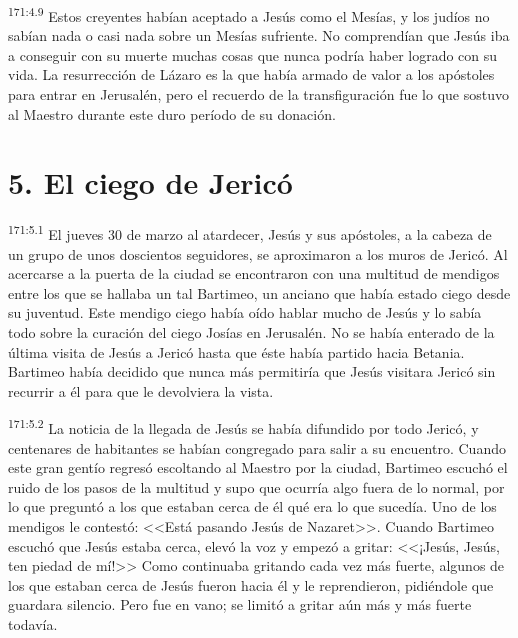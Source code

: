 \par 
\textsuperscript{171:4.9} Estos creyentes habían aceptado a Jesús como el Mesías, y los judíos no sabían nada o casi nada sobre un Mesías sufriente. No comprendían que Jesús iba a conseguir con su muerte muchas cosas que nunca podría haber logrado con su vida. La resurrección de Lázaro es la que había armado de valor a los apóstoles para entrar en Jerusalén, pero el recuerdo de la transfiguración fue lo que sostuvo al Maestro durante este duro período de su donación.

\section*{5. El ciego de Jericó}
\par 
\textsuperscript{171:5.1} El jueves 30 de marzo al atardecer, Jesús y sus apóstoles, a la cabeza de un grupo de unos doscientos seguidores, se aproximaron a los muros de Jericó. Al acercarse a la puerta de la ciudad se encontraron con una multitud de mendigos entre los que se hallaba un tal Bartimeo, un anciano que había estado ciego desde su juventud. Este mendigo ciego había oído hablar mucho de Jesús y lo sabía todo sobre la curación del ciego Josías en Jerusalén. No se había enterado de la última visita de Jesús a Jericó hasta que éste había partido hacia Betania. Bartimeo había decidido que nunca más permitiría que Jesús visitara Jericó sin recurrir a él para que le devolviera la vista.

\par 
\textsuperscript{171:5.2} La noticia de la llegada de Jesús se había difundido por todo Jericó, y centenares de habitantes se habían congregado para salir a su encuentro. Cuando este gran gentío regresó escoltando al Maestro por la ciudad, Bartimeo escuchó el ruido de los pasos de la multitud y supo que ocurría algo fuera de lo normal, por lo que preguntó a los que estaban cerca de él qué era lo que sucedía. Uno de los mendigos le contestó: <<Está pasando Jesús de Nazaret>>. Cuando Bartimeo escuchó que Jesús estaba cerca, elevó la voz y empezó a gritar: <<¡Jesús, Jesús, ten piedad de mí!>> Como continuaba gritando cada vez más fuerte, algunos de los que estaban cerca de Jesús fueron hacia él y le reprendieron, pidiéndole que guardara silencio. Pero fue en vano; se limitó a gritar aún más y más fuerte todavía.

